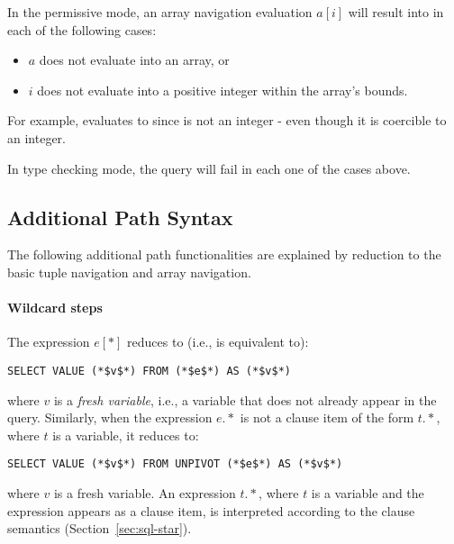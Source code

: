 In the permissive mode, an array navigation evaluation $a[i]$ will result into
 in each of the following cases:

\begin{itemize}
\item $a$ does not evaluate into an array, or
\item $i$ does not evaluate into a positive integer within the array's bounds.
\end{itemize}

For example, \gt{[1,2,3][1.0]} evaluates to  since  is not
an integer - even though it is coercible to an integer.
 
In type checking mode, the query will fail in each one of the cases above.

\subsection{Additional Path Syntax}
\label{sec:deep-navigation}

The following additional path functionalities are explained by reduction
to the basic tuple navigation and array navigation.

\paragraph{Wildcard steps} The expression $e[*]$ reduces to (i.e., is
equivalent to):

\begin{lstlisting}
SELECT VALUE (*$v$*) FROM (*$e$*) AS (*$v$*)
\end{lstlisting}

\noindent where $v$ is a \textit{fresh variable}, i.e., a variable that does not
already appear in the query.  Similarly, when the expression $e.*$ is not a
 clause item of the form $t.*$, where $t$ is a variable, it reduces
to:

\begin{lstlisting}
SELECT VALUE (*$v$*) FROM UNPIVOT (*$e$*) AS (*$v$*)
\end{lstlisting}

\noindent where $v$ is a fresh variable. An expression $t.*$, where $t$ is a
variable and the expression appears as a  clause item, is interpreted
according to the  clause \gl{*} semantics
(Section~\ref{sec:sql-star}).

